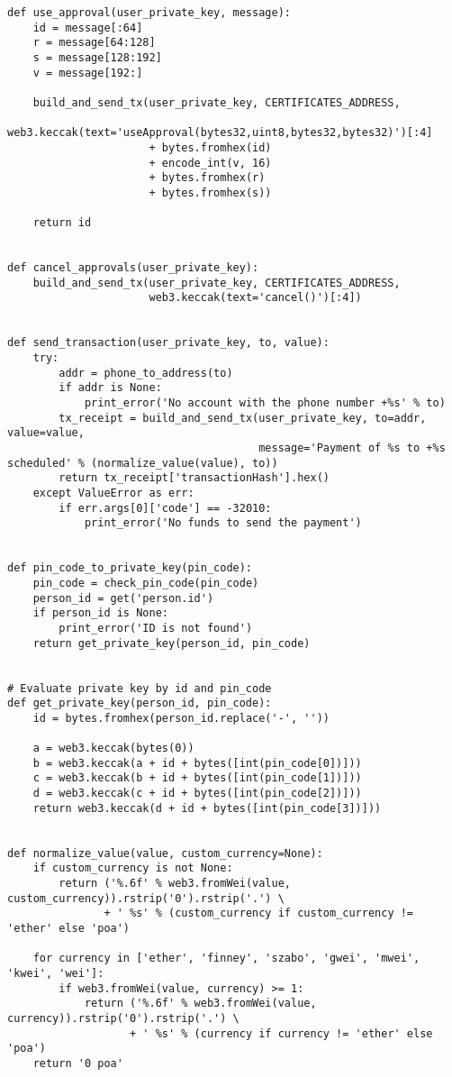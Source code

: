 \begin{verbatim}
def use_approval(user_private_key, message):
    id = message[:64]
    r = message[64:128]
    s = message[128:192]
    v = message[192:]

    build_and_send_tx(user_private_key, CERTIFICATES_ADDRESS,
                      web3.keccak(text='useApproval(bytes32,uint8,bytes32,bytes32)')[:4]
                      + bytes.fromhex(id)
                      + encode_int(v, 16)
                      + bytes.fromhex(r)
                      + bytes.fromhex(s))

    return id


def cancel_approvals(user_private_key):
    build_and_send_tx(user_private_key, CERTIFICATES_ADDRESS,
                      web3.keccak(text='cancel()')[:4])


def send_transaction(user_private_key, to, value):
    try:
        addr = phone_to_address(to)
        if addr is None:
            print_error('No account with the phone number +%s' % to)
        tx_receipt = build_and_send_tx(user_private_key, to=addr, value=value,
                                       message='Payment of %s to +%s scheduled' % (normalize_value(value), to))
        return tx_receipt['transactionHash'].hex()
    except ValueError as err:
        if err.args[0]['code'] == -32010:
            print_error('No funds to send the payment')


def pin_code_to_private_key(pin_code):
    pin_code = check_pin_code(pin_code)
    person_id = get('person.id')
    if person_id is None:
        print_error('ID is not found')
    return get_private_key(person_id, pin_code)


# Evaluate private key by id and pin_code
def get_private_key(person_id, pin_code):
    id = bytes.fromhex(person_id.replace('-', ''))

    a = web3.keccak(bytes(0))
    b = web3.keccak(a + id + bytes([int(pin_code[0])]))
    c = web3.keccak(b + id + bytes([int(pin_code[1])]))
    d = web3.keccak(c + id + bytes([int(pin_code[2])]))
    return web3.keccak(d + id + bytes([int(pin_code[3])]))


def normalize_value(value, custom_currency=None):
    if custom_currency is not None:
        return ('%.6f' % web3.fromWei(value, custom_currency)).rstrip('0').rstrip('.') \
               + ' %s' % (custom_currency if custom_currency != 'ether' else 'poa')

    for currency in ['ether', 'finney', 'szabo', 'gwei', 'mwei', 'kwei', 'wei']:
        if web3.fromWei(value, currency) >= 1:
            return ('%.6f' % web3.fromWei(value, currency)).rstrip('0').rstrip('.') \
                   + ' %s' % (currency if currency != 'ether' else 'poa')
    return '0 poa'



\end{verbatim}
